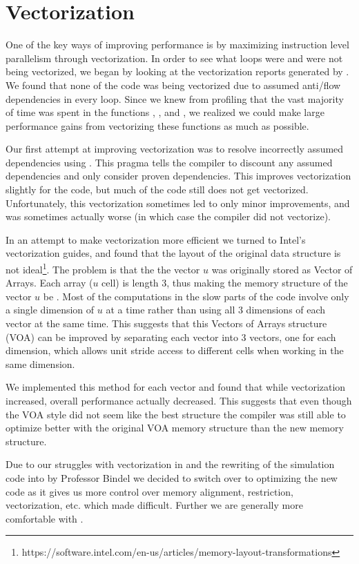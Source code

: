 \section{Vectorization}

One of the key ways of improving performance is by maximizing instruction level parallelism through vectorization. In order to see what loops were and were not being vectorized, we began by looking at the vectorization reports generated by . We found that none of the  code was being vectorized due to assumed anti/flow dependencies in every  loop. Since we knew from profiling that the vast majority of time was spent in the functions , , and , we realized we could make large performance gains from vectorizing these functions as much as possible.

Our first attempt at improving vectorization was to resolve incorrectly assumed dependencies using . This pragma tells the compiler to discount any assumed dependencies and only consider proven dependencies. This improves vectorization slightly for the  code, but much of the code still does not get vectorized. Unfortunately, this vectorization sometimes led to only minor improvements, and was sometimes actually worse (in which case the compiler did not vectorize).

In an attempt to make vectorization more efficient we turned to Intel's vectorization guides, and found that the layout of the original data structure is not ideal\footnote{https://software.intel.com/en-us/articles/memory-layout-transformations}. The problem is that the the vector $u$ was originally stored as Vector of Arrays. Each array ($u$ cell) is length 3, thus making the memory structure of the vector $u$ be \ttt{[U0, U1, U2, U0, U1, U2, ...]}. Most of the computations in the slow parts of the code involve only a single dimension of $u$ at a time rather than using all 3 dimensions of each vector at the same time. This suggests that this Vectors of Arrays structure (VOA) can be improved by separating each vector into 3 vectors, one for each dimension, which allows unit stride access to different cells when working in the same dimension.

We implemented this method for each vector and found that while vectorization increased, overall performance actually decreased. This suggests that even though the VOA style did not seem like the best structure the compiler was still able to optimize better with the original VOA memory structure than the new memory structure.

Due to our struggles with vectorization in  and the rewriting of the simulation code into  by Professor Bindel we decided to switch over to optimizing the new  code as it gives us more control over memory alignment, restriction, vectorization, etc. which  made difficult. Further we are generally more comfortable with .
